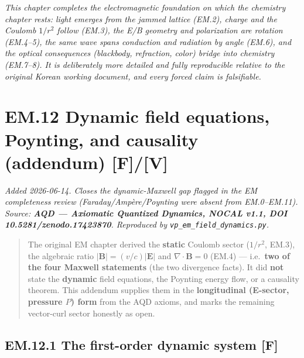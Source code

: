 \documentclass[
  10pt,
]{article}
\begin{document}
\emph{This chapter completes the electromagnetic foundation on which the
chemistry chapter rests: light emerges from the jammed lattice (EM.2),
charge and the Coulomb \(1/r^2\) follow (EM.3), the E/B geometry and
polarization are rotation (EM.4--5), the same wave spans conduction and
radiation by angle (EM.6), and the optical consequences (blackbody,
refraction, color) bridge into chemistry (EM.7--8). It is deliberately
more detailed and fully reproducible relative to the original Korean
working document, and every forced claim is falsifiable.}

\hypertarget{em.12-dynamic-field-equations-poynting-and-causality-addendum-fv}{%
\section{\texorpdfstring{EM.12 Dynamic field equations, Poynting, and
causality (addendum)
\textbf{{[}F{]}/{[}V{]}}}{EM.12 Dynamic field equations, Poynting, and causality (addendum) {[}F{]}/{[}V{]}}}\label{em.12-dynamic-field-equations-poynting-and-causality-addendum-fv}}

\emph{Added 2026-06-14. Closes the dynamic-Maxwell gap flagged in the EM
completeness review (Faraday/Ampère/Poynting were absent from
EM.0--EM.11). Source: \textbf{AQD --- Axiomatic Quantized Dynamics,
NOCAL v1.1, DOI 10.5281/zenodo.17423870}. Reproduced by
\texttt{vp\_em\_field\_dynamics.py}.}

\begin{quote}
The original EM chapter derived the \textbf{static} Coulomb sector
(\(1/r^2\), EM.3), the algebraic ratio \(|\mathbf B|=(v/c)|\mathbf E|\)
and \(\nabla\!\cdot\mathbf B=0\) (EM.4) --- i.e.~\textbf{two of the four
Maxwell statements} (the two divergence facts). It did \textbf{not}
state the \textbf{dynamic} field equations, the Poynting energy flow, or
a causality theorem. This addendum supplies them in the
\textbf{longitudinal (E-sector, pressure \(P\)) form} from the AQD
axioms, and marks the remaining vector-curl sector honestly as open.
\end{quote}

\hypertarget{em.12.1-the-first-order-dynamic-system-f}{%
\subsection{\texorpdfstring{EM.12.1 The first-order dynamic system
\textbf{{[}F{]}}}{EM.12.1 The first-order dynamic system {[}F{]}}}\label{em.12.1-the-first-order-dynamic-system-f}}
\end{document}
